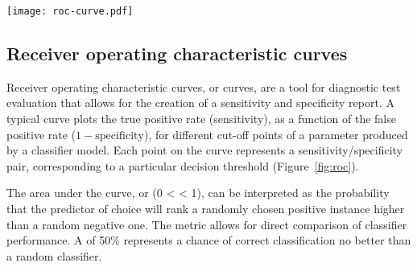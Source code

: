 \begin{marginfigure}%
    \texttt{[image: roc-curve.pdf]}
    \caption[Example of a receiver operating characteristic (
    curve)]{Receiver operating characteristic curves () are
      visual representations of the trade-off between sensitivity (the
      proportion of actual positives which are correctly identified) and
      specificity (the proportion of true negatives correctly identified) of a
      diagnostic test, or classifier.  %
      The ability to superimpose different s on the same plot
      allows for direct comparison of different classifiers.}
    \label{fig:roc}%
\end{marginfigure}

\subsection{Receiver operating characteristic curves}
\label{sec:methods-roc}

Receiver operating characteristic curves, or  curves, are a tool
for diagnostic test evaluation that allows for the creation of a sensitivity and
specificity report.\cite{fawcett_introduction_2006} A typical 
curve plots the true positive rate (sensitivity), as a function of the false
positive rate ($1-\text{specificity}$), for different cut-off points of a
parameter produced by a classifier model.  Each point on the
 curve represents a sensitivity/specificity pair, corresponding
to a particular decision threshold (Figure~\ref{fig:roc}).

The area under the curve, or  (0 <  < 1), can be
interpreted as the probability that the predictor of choice will rank a randomly
chosen positive instance higher than a random negative
one.\cite{hanley_meaning_1982}
The  metric allows for direct comparison of classifier
performance.  A  of 50\% represents a chance of correct
classification no better than a random classifier.


